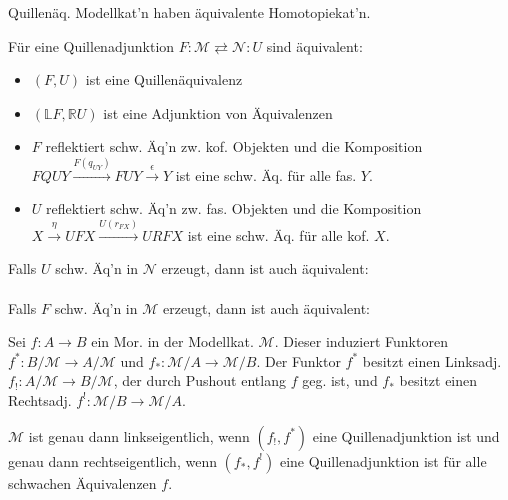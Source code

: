 \documentclass{cheat-sheet}
\newcommand{\ModC}{\mathcal{M}} %
\newcommand{\NodC}{\mathcal{N}} %
\newcommand{\LD}[1]{\mathbb{L} #1} %
\newcommand{\RD}[1]{\mathbb{R} #1} %
\begin{document}
\begin{kor}
  Quillenäq. Modellkat'n haben äquivalente Homotopiekat'n.
\end{kor}

\begin{prop}
  Für eine Quillenadjunktion $F : \ModC \rightleftarrows \NodC : U$ sind äquivalent:
  \begin{itemize}
    \item $(F, U)$ ist eine Quillenäquivalenz
    \item $(\LD{F}, \RD{U})$ ist eine Adjunktion von Äquivalenzen
    \item $F$ reflektiert schw. Äq'n zw. kof. Objekten und die Komposition $FQUY \xrightarrow{F(q_{UY})} FUY \xrightarrow{\epsilon} Y$ ist eine schw. Äq. für alle fas. $Y$.
    \item $U$ reflektiert schw. Äq'n zw. fas. Objekten und die Komposition $X \xrightarrow{\eta} UFX \xrightarrow{U(r_{FX})} URFX$ ist eine schw. Äq. für alle kof. $X$.
  \end{itemize}
  Falls $U$ schw. Äq'n in $\NodC$ erzeugt, dann ist auch äquivalent: \\
   \\[2pt]
  Falls $F$ schw. Äq'n in $\ModC$ erzeugt, dann ist auch äquivalent: \\
\end{prop}

\begin{defn}
  Sei $f : A \to B$ ein Mor. in der Modellkat. $\ModC$. Dieser induziert Funktoren $f^* : B/\ModC \to A/\ModC$ und $f_* : \ModC/A \to \ModC/B$.
  Der Funktor $f^*$ besitzt einen Linksadj. $f_{!} : A/\ModC \to B/\ModC$, der durch Pushout entlang $f$ geg. ist, und $f_*$ besitzt einen Rechtsadj. $f^{!} : \ModC/B \!\to\! \ModC/A$.
\end{defn}

\begin{prop}
  $\ModC$ ist genau dann linkseigentlich, wenn $(f_{!}, f^*)$ eine Quillenadjunktion ist und genau dann rechtseigentlich, wenn $(f_*, f^{!})$ eine Quillenadjunktion ist für alle schwachen Äquivalenzen $f$.
\end{prop}

\end{document}
